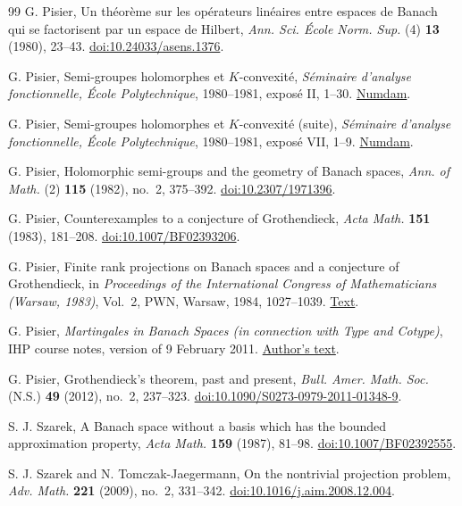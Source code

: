 \begin{thebibliography}{99}
G. Pisier,
Un th\'eor\`eme sur les op\'erateurs lin\'eaires entre espaces de Banach
qui se factorisent par un espace de Hilbert,
\emph{Ann. Sci. \'Ecole Norm. Sup.} (4) \textbf{13} (1980), 23--43.
\href{https://doi.org/10.24033/asens.1376}{doi:10.24033/asens.1376}.

G. Pisier,
Semi-groupes holomorphes et \(K\)-convexit\'e,
\emph{S\'eminaire d'analyse fonctionnelle, \'Ecole Polytechnique},
1980--1981, expos\'e II, 1--30.
\href{https://www.numdam.org/item/SAF_1980-1981____A2_0/}{Numdam}.

G. Pisier,
Semi-groupes holomorphes et \(K\)-convexit\'e (suite),
\emph{S\'eminaire d'analyse fonctionnelle, \'Ecole Polytechnique},
1980--1981, expos\'e VII, 1--9.
\href{https://www.numdam.org/item/SAF_1980-1981____A7_0/}{Numdam}.

G. Pisier,
Holomorphic semi-groups and the geometry of Banach spaces,
\emph{Ann. of Math.} (2) \textbf{115} (1982), no.~2, 375--392.
\href{https://doi.org/10.2307/1971396}{doi:10.2307/1971396}.

G. Pisier,
Counterexamples to a conjecture of Grothendieck,
\emph{Acta Math.} \textbf{151} (1983), 181--208.
\href{https://doi.org/10.1007/BF02393206}{doi:10.1007/BF02393206}.

G. Pisier,
Finite rank projections on Banach spaces and a conjecture of Grothendieck,
in \emph{Proceedings of the International Congress of Mathematicians
(Warsaw, 1983)}, Vol.~2, PWN, Warsaw, 1984, 1027--1039.
\href{https://www.imj-prg.fr/wp-content/uploads/2020/prix/pisier1983.pdf}{Text}.

G. Pisier,
\emph{Martingales in Banach Spaces
(in connection with Type and Cotype)},
IHP course notes, version of 9 February 2011.
\href{https://webusers.imj-prg.fr/~gilles.pisier/ihp-pisier.pdf}{Author's text}.

G. Pisier,
Grothendieck's theorem, past and present,
\emph{Bull. Amer. Math. Soc.} (N.S.) \textbf{49} (2012), no.~2,
237--323.
\href{https://doi.org/10.1090/S0273-0979-2011-01348-9}{doi:10.1090/S0273-0979-2011-01348-9}.

S. J. Szarek,
A Banach space without a basis which has the bounded approximation property,
\emph{Acta Math.} \textbf{159} (1987), 81--98.
\href{https://doi.org/10.1007/BF02392555}{doi:10.1007/BF02392555}.

S. J. Szarek and N. Tomczak-Jaegermann,
On the nontrivial projection problem,
\emph{Adv. Math.} \textbf{221} (2009), no.~2, 331--342.
\href{https://doi.org/10.1016/j.aim.2008.12.004}{doi:10.1016/j.aim.2008.12.004}.

\end{thebibliography}
\endgroup
